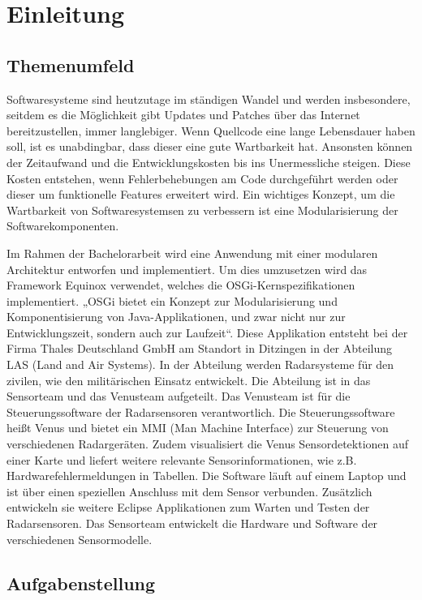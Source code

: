 \chapter{Einleitung}

\section{Themenumfeld}
Softwaresysteme sind heutzutage im ständigen Wandel und werden insbesondere, seitdem es die Möglichkeit gibt Updates und Patches über das Internet bereitzustellen, immer langlebiger. Wenn Quellcode eine lange Lebensdauer haben soll, ist es unabdingbar, dass dieser eine gute Wartbarkeit hat. Ansonsten können der Zeitaufwand und die Entwicklungskosten bis ins Unermessliche steigen. Diese Kosten entstehen, wenn Fehlerbehebungen am Code durchgeführt werden oder dieser um funktionelle Features erweitert wird. Ein wichtiges Konzept, um die Wartbarkeit von Softwaresystemsen zu verbessern ist eine Modularisierung der Softwarekomponenten.

Im Rahmen der Bachelorarbeit wird eine Anwendung mit einer modularen Architektur entworfen und implementiert. Um dies umzusetzen wird das Framework Equinox verwendet, welches die OSGi-Kernspezifikationen implementiert. „OSGi bietet ein Konzept zur Modularisierung und Komponentisierung von Java-Applikationen, und zwar nicht nur zur Entwicklungszeit, sondern auch zur Laufzeit“. Diese Applikation entsteht bei der Firma Thales Deutschland GmbH am Standort in Ditzingen in der Abteilung LAS (Land and Air Systems). In der Abteilung werden Radarsysteme für den zivilen, wie den militärischen Einsatz entwickelt.  Die Abteilung ist in das Sensorteam und das Venusteam aufgeteilt. Das Venusteam ist für die Steuerungssoftware der Radarsensoren verantwortlich. Die Steuerungssoftware heißt Venus und bietet ein MMI (Man Machine Interface) zur Steuerung von verschiedenen Radargeräten. Zudem visualisiert die Venus Sensordetektionen auf einer Karte und liefert weitere relevante Sensorinformationen, wie z.B. Hardwarefehlermeldungen in Tabellen. Die Software läuft auf einem Laptop und ist über einen speziellen Anschluss mit dem Sensor verbunden.  Zusätzlich entwickeln sie weitere Eclipse Applikationen zum Warten und Testen der Radarsensoren. Das Sensorteam entwickelt die Hardware und Software der verschiedenen Sensormodelle.

\section{Aufgabenstellung}

